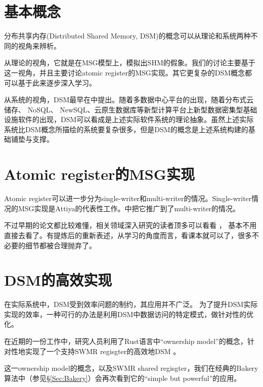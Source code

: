 \documentclass[UTF8]{ctexrep}
\begin{document}
\section{基本概念}

分布共享内存(Distributed Shared Memory, DSM)的概念可以从理论和系统两种不同的视角来辨析。

从理论的视角，它就是在MSG模型上，模拟出SHM的假象。我们的讨论主要基于这一视角，并且主要讨论atomic register的MSG实现。其它更复杂的DSM概念都可以基于此来逐步深入学习。

从系统的视角，DSM最早在\cite{Li89}中提出。随着多数据中心平台的出现，随着分布式云储存、 NoSQL、 NewSQL、云原生数据库等新型计算平台上新型数据密集型基础设施软件的出现，DSM可以看成是上述实际软件系统的理论抽象。虽然上述实际系统比DSM概念所描绘的系统要复杂很多，但是DSM的概念是上述系统构建的基础铺垫与支撑。

\section{Atomic register的MSG实现}

Atomic register可以进一步分为single-writer和multi-writer的情况。Single-writer情况的MSG实现是Attiya的代表性工作\cite{Attiya95}。\cite{Lynch97}中把它推广到了multi-writer的情况。

不过早期的论文都比较难懂，相关领域深入研究的读者顶多可以看看 \cite{Attiya95}，\cite{Lynch97} 基本不用直接去看了。\cite[Chap 16]{Aspnes19}有提炼后的重新表述，从学习的角度而言，看课本就可以了，很多不必要的细节都被合理抛弃了。

\section{DSM的高效实现}

在实际系统中，DSM受到效率问题的制约，其应用并不广泛。
为了提升DSM实际实现的效率，一种可行的办法是利用DSM中数据访问的特定模式，做针对性的优化。

在近期的一份工作中，研究人员利用了Rust语言中“ownership model”的概念，针对性地实现了一个支持SWMR regisgter的高效地DSM \cite{Ma24}。

这一ownership model的概念，以及SWMR shared regisgter，我们在经典的Bakery算法中（参见\S \ref{Sec:Bakery}）会再次看到它的“simple but powerful”的应用。

\end{document}
